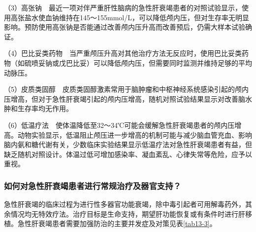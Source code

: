 （3）高张钠　最近一项对伴严重肝性脑病的急性肝衰竭患者的对照试验显示，使用高张盐水使血钠维持在145～155mmol/L，可以降低颅内压，但对生存率无明显影响。预防使用高张钠是否能通过改善颅内压升高而改善预后，仍需大样本试验确证。

（4）巴比妥类药物　当严重颅压升高对其他治疗方法无反应时，使用巴比妥类药物（如硫喷妥钠或戊巴比妥）可以降低颅内压，但需要同时监测并维持足够的平均动脉压。

（5）皮质类固醇　皮质类固醇激素常用于脑肿瘤和中枢神经系统感染引起的颅内压增高，但对于急性肝衰竭引起的颅内压增高，随机对照试验结果显示对改善脑水肿和生存率均无作用。

（6）低温疗法　使体温降低至32～34℃可能会缓解急性肝衰竭患者的颅内压增高。动物实验显示，低温阻止颅压进一步增高的机制可能与减少脑血管充血、影响脑内氨和糖代谢有关，少数临床实验结果显示低温疗法对急性肝衰竭患者有益，但缺乏随机对照设计。体温过低可增加感染率、凝血紊乱、心律失常等危险，应予以重视。

\subsubsection{如何对急性肝衰竭患者进行常规治疗及器官支持？}

急性肝衰竭的临床过程为进行性多器官功能衰竭，除中毒引起者可用解毒药外，其余情况均无特效疗法。治疗目标是生命支持，期望肝功能恢复或有条件时进行肝移植。急性肝衰竭患者需要加强防治的主要并发症及对策见表\ref{tab13-3}。

